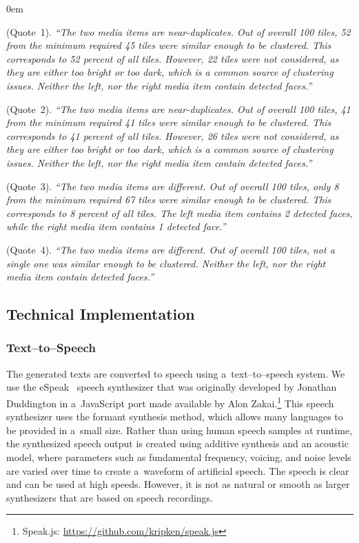 \documentclass{article}
\begin{document}
\begin{description}
  \itemsep0em
  \item[Clustering Consent] (Quote~1). \textit{``The two media items are near-duplicates. Out of overall 100 tiles, 52 from the minimum required 45 tiles
      were similar enough to be clustered. This corresponds to 52 percent of all tiles. However, 22 tiles were not considered, as they are either too bright or too dark, which is a common source of clustering issues. Neither the left, nor the right media item contain detected faces.''}
  \item[Clustering Dissent] (Quote~2). \textit{``The two media items are near-duplicates. Out of overall 100 tiles, 41 from the minimum required 41 tiles were similar enough to be clustered. This corresponds to 41 percent of all tiles. However, 26 tiles were not considered, as they are either too bright
      or too dark, which is a common source of clustering issues. Neither the left, nor the right media item contain detected faces.''}
  \item[Non-Clustering Dissent] (Quote~3). \textit{``The two media items are different. Out of overall 100 tiles, only 8 from the minimum required 67 tiles
      were similar enough to be clustered. This corresponds to 8 percent of all tiles. The left media item contains 2 detected faces, while the right media item contains 1 detected face.''}
  \item[(Non-Clustering Consent)] (Quote~4). \textit{``The two media items are different. Out of overall 100 tiles, not a single one was similar enough to be clustered. Neither the left, nor the right media item contain detected faces.''}
\end{description}

\subsection{Technical Implementation}

\subsubsection{Text--to--Speech}
The generated texts are converted to speech using a~text--to--speech system. We use the eSpeak~\cite{duddington2012espeak} speech synthesizer that was originally developed by Jonathan Duddington in a~JavaScript port made available by Alon Zakai.\footnote{Speak.js: \url{https://github.com/kripken/speak.js}} This speech synthesizer uses the formant synthesis method, which allows many languages to be provided in a~small size. Rather than using human speech samples at runtime, the synthesized speech output is created using additive synthesis and an acoustic model, where parameters such as fundamental frequency, voicing, and noise levels
are varied over time to create a~waveform of artificial speech. The speech is clear and can be used at high speeds. However, it is not as natural or smooth as larger synthesizers that are based on speech recordings.
\end{document}
